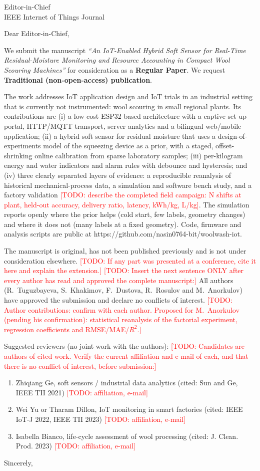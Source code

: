 \documentclass[10pt]{letter}
\newcommand{\TODO}[1]{\textcolor{red}{[TODO: #1]}}
\begin{document}
\begin{letter}{Editor-in-Chief\\IEEE Internet of Things Journal}
\opening{Dear Editor-in-Chief,}

We submit the manuscript \emph{``An IoT-Enabled Hybrid Soft Sensor for Real-Time Residual-Moisture Monitoring and
Resource Accounting in Compact Wool Scouring Machines''} for consideration as a \textbf{Regular Paper}. We request
\textbf{Traditional (non-open-access) publication}.

The work addresses IoT application design and IoT trials in an industrial setting that is currently not instrumented:
wool scouring in small regional plants. Its contributions are (i) a low-cost ESP32-based architecture with a captive
set-up portal, HTTP/MQTT transport, server analytics and a bilingual web/mobile application; (ii) a hybrid soft sensor
for residual moisture that uses a design-of-experiments model of the squeezing device as a prior, with a staged,
offset-shrinking online calibration from sparse laboratory samples; (iii) per-kilogram energy and water indicators and
alarm rules with debounce and hysteresis; and (iv) three clearly separated layers of evidence: a reproducible
reanalysis of historical mechanical-process data, a simulation and software bench study, and a factory validation
\TODO{describe the completed field campaign: N shifts at plant, held-out accuracy, delivery ratio, latency, kWh/kg,
L/kg}. The simulation reports openly where the prior helps (cold start, few labels, geometry changes) and where it
does not (many labels at a fixed geometry). Code, firmware and analysis scripts are public at
https://github.com/nasin0764-bit/woolwash-iot.

The manuscript is original, has not been published previously and is not under consideration elsewhere.
\TODO{If any part was presented at a conference, cite it here and explain the extension.}
\TODO{Insert the next sentence ONLY after every author has read and approved the complete manuscript:}
All authors (R.~Tuguzbayeva, S.~Khakimov, F.~Dustova, R.~Rosulov and M.~Anorkulov) have approved the submission and
declare no conflicts of interest.
\TODO{Author contributions: confirm with each author. Proposed for M.~Anorkulov (pending his confirmation):
statistical reanalysis of the factorial experiment, regression coefficients and RMSE/MAE/$R^2$.}

Suggested reviewers (no joint work with the authors):
\TODO{Candidates are authors of cited work. Verify the current affiliation and e-mail of each, and that there is no
conflict of interest, before submission:}
\begin{enumerate}
\item Zhiqiang Ge, soft sensors / industrial data analytics (cited: Sun and Ge, IEEE TII 2021) \TODO{affiliation, e-mail}
\item Wei Yu or Tharam Dillon, IoT monitoring in smart factories (cited: IEEE IoT-J 2022, IEEE TII 2023) \TODO{affiliation, e-mail}
\item Isabella Bianco, life-cycle assessment of wool processing (cited: J. Clean. Prod. 2023) \TODO{affiliation, e-mail}
\end{enumerate}

\closing{Sincerely,}
\end{letter}
\end{document}
